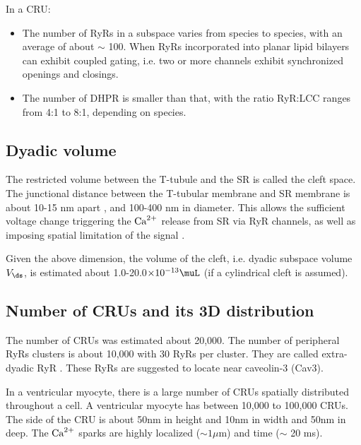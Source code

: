 In a CRU:
\begin{itemize}
\item The number of RyRs in a subspace varies from species to species, with
  an average of about $\sim$ 100. When RyRs incorporated into planar
  lipid bilayers can exhibit coupled gating, i.e. two or more channels
  exhibit synchronized openings and closings. 

\item The number of DHPR is smaller than that, with the ratio RyR:LCC
  ranges from 4:1 to 8:1, depending on species.
\end{itemize}


\subsection{Dyadic volume}

The restricted volume between the T-tubule and the SR is called the cleft space.
The junctional distance between the T-tubular membrane and SR membrane is about
10-15 nm apart \citep{langer1996, franzini_armstrong1999ssd}, and
100-400 nm in diameter. This allows the sufficient voltage change triggering the
${\text{Ca}^{2+}}$ release from SR via RyR channels, as well as imposing spatial limitation
of the signal \citep{franzini_armstrong1997}. 

Given the above dimension, the volume of the cleft, i.e. dyadic subspace volume
$V_\ds$, is estimated about 1.0-20.0$\times 10^{-13} \muL$ (if a cylindrical
cleft is assumed).


\subsection{Number of CRUs and its 3D distribution}
\label{sec:3d-distr-carus}

The number of CRUs was estimated about 20,000. The number of peripheral RyRs
clusters is about 10,000 with 30 RyRs per cluster. They are called extra-dyadic
RyR \citep{asghari2012}. These RyRs are suggested to locate near caveolin-3
(Cav3).


\begin{framed}
  In a ventricular myocyte, there is a large number of CRUs spatially
  distributed throughout a cell. A ventricular myocyte has between
  10,000 to 100,000 CRUs.  The side of the CRU is about 50nm in height
  and 10nm in width and 50nm in deep.  The ${\text{Ca}^{2+}}$ sparks are
  highly localized ($\sim 1\mu$m) and time ($\sim$ 20 ms).
\end{framed}

